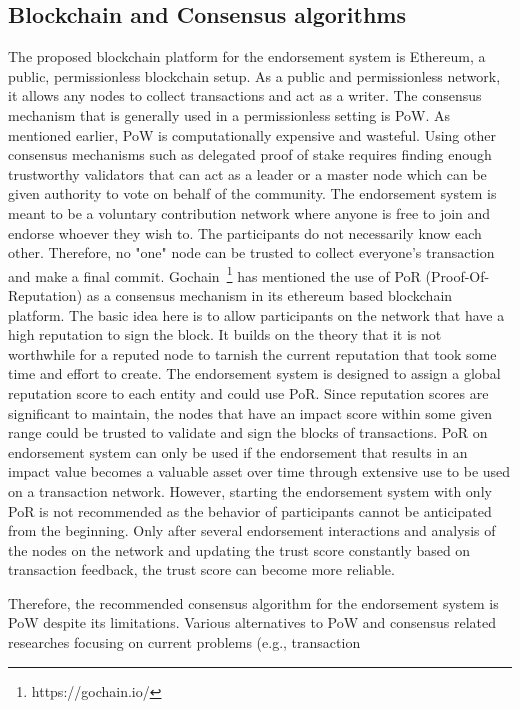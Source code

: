 \subsection{Blockchain and Consensus algorithms}\label{subsec:bcConsensus}
The proposed blockchain platform for the endorsement system is Ethereum, a
public, permissionless blockchain setup. As a public and permissionless
network, it allows any nodes to collect transactions and act as a writer. The
consensus mechanism that is generally used in a permissionless setting is
\ac{PoW}. As mentioned earlier, \ac{PoW} is computationally expensive and wasteful.
Using other consensus mechanisms such as delegated proof of stake requires
finding enough trustworthy validators that can act as a leader or a master node
which can be given authority to vote on behalf of the community.  The
endorsement system is meant to be a voluntary contribution network where anyone
is free to join and endorse whoever they wish to. The participants do not
necessarily know each other. Therefore, no "one" node can be trusted to collect
everyone's transaction and make a final commit.
Gochain~\footnote{https://gochain.io/} has mentioned the use of PoR
(Proof-Of-Reputation) as a consensus mechanism in its ethereum based blockchain
platform. The basic idea here is to allow participants on the network that have
a high reputation to sign the block. It builds on the theory that it is not
worthwhile for a reputed node to tarnish the current reputation that took some
time and effort to create. The endorsement system is designed to assign a
global reputation score to each entity and could use PoR. Since reputation
scores are significant to maintain, the nodes that have an impact score within
some given range could be trusted to validate and sign the blocks of
transactions. PoR on endorsement system can only be used if the endorsement
that results in an impact value becomes a valuable asset over time through
extensive use to be used on a transaction network. However, starting the
endorsement system with only PoR is not recommended as the behavior of
participants cannot be anticipated from the beginning. Only after several
endorsement interactions and analysis of the nodes on the network and updating
the trust score constantly based on transaction feedback, the trust score can
become more reliable. \par
Therefore, the recommended consensus algorithm for the endorsement system is
\ac{PoW} despite its limitations. Various alternatives to \ac{PoW} and
consensus related researches focusing on current problems (e.g.,  transaction
